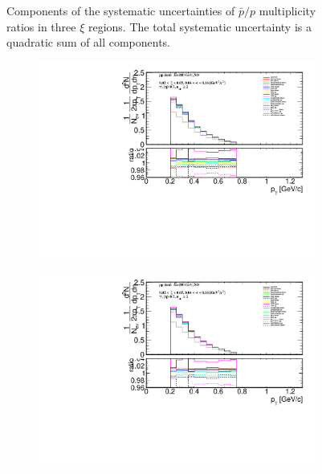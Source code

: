 \begin{figure}[h!]
\begin{subfigure}{.49\textwidth}
		\end{subfigure}
		\begin{minipage}{.49\textwidth}
			\caption[Components of the systematic uncertainties of $\bar{p}/p$ multiplicity ratios  in three $\xi$ regions]{Components of the systematic uncertainties of $\bar{p}/p$ multiplicity ratios  in three $\xi$ regions. The total  systematic uncertainty is a quadratic sum of all  components.}
			\label{fig:results_star_syst_p}
		\end{minipage}
\end{figure}

\begin{figure}[t!]
	
	\centering
		\begin{subfigure}{.49\textwidth}
			\includegraphics[width=\textwidth,page=37]{chapters/chrgSTAR/img/syst/outPID_SDT_ratio.pdf}
		\end{subfigure}
		\begin{subfigure}{.49\textwidth}
			\includegraphics[width=\textwidth,page=38]{chapters/chrgSTAR/img/syst/outPID_SDT_ratio.pdf}

\end{subfigure}
\end{figure}
